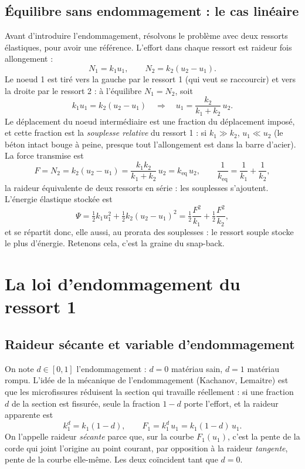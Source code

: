 \documentclass[11pt,a4paper]{article}
\newcommand{\kd}{k_1^{d}}
\begin{document}
\subsection{Équilibre sans endommagement : le cas linéaire}
Avant d'introduire l'endommagement, résolvons le problème avec deux ressorts élastiques, pour
avoir une référence. L'effort dans chaque ressort est raideur fois allongement :
\begin{equation}
  N_1 = k_1u_1,\qquad N_2 = k_2(u_2-u_1).
\end{equation}
Le noeud 1 est tiré vers la gauche par le ressort 1 (qui veut se raccourcir) et vers la droite
par le ressort 2 : à l'équilibre $N_1 = N_2$, soit
\begin{equation}
  k_1u_1 = k_2(u_2-u_1)\quad\Longrightarrow\quad u_1 = \frac{k_2}{k_1+k_2}\,u_2 .
  \label{eq:lin}
\end{equation}
Le déplacement du noeud intermédiaire est une fraction du déplacement imposé, et cette fraction
est la \emph{souplesse relative} du ressort 1 : si $k_1 \gg k_2$, $u_1 \ll u_2$ (le béton intact
bouge à peine, presque tout l'allongement est dans la barre d'acier). La force transmise est
\begin{equation}
  F = N_2 = k_2(u_2-u_1) = \frac{k_1k_2}{k_1+k_2}\,u_2 = k_{\text{eq}}\,u_2,\qquad
  \frac{1}{k_{\text{eq}}} = \frac1{k_1}+\frac1{k_2},
\end{equation}
la raideur équivalente de deux ressorts en série : les souplesses s'ajoutent. L'énergie
élastique stockée est
\begin{equation}
  \Psi = \tfrac12k_1u_1^2 + \tfrac12k_2(u_2-u_1)^2
  = \tfrac12\frac{F^2}{k_1} + \tfrac12\frac{F^2}{k_2},
\end{equation}
et se répartit donc, elle aussi, au prorata des souplesses : le ressort souple stocke le plus
d'énergie. Retenons cela, c'est la graine du snap-back.

\section{La loi d'endommagement du ressort 1}

\subsection{Raideur sécante et variable d'endommagement}
On note $d\in[0,1]$ l'endommagement : $d = 0$ matériau sain, $d = 1$ matériau rompu.
L'idée de la mécanique de l'endommagement (Kachanov, Lemaitre) est que les microfissures
réduisent la section qui travaille réellement : si une fraction $d$ de la section est
fissurée, seule la fraction $1-d$ porte l'effort, et la raideur apparente est
\begin{equation}
  \kd = k_1(1-d),\qquad F_1 = \kd\,u_1 = k_1(1-d)\,u_1 .
\end{equation}
On l'appelle raideur \emph{sécante} parce que, sur la courbe $F_1(u_1)$, c'est la pente de la
corde qui joint l'origine au point courant, par opposition à la raideur \emph{tangente},
pente de la courbe elle-même. Les deux coïncident tant que $d = 0$.
\end{document}
